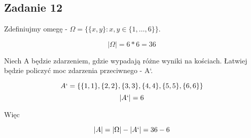 \subsection{Zadanie 12}

Zdefiniujmy omegę - $\Omega = \{\{x,y\} : x, y \in \{1, \dots , 6\}\}$.

$$|\Omega| = 6 * 6 = 36$$

Niech A będzie zdarzeniem, gdzie wypadają różne wyniki na kościach.
Łatwiej będzie policzyć moc zdarzenia przeciwnego - A`.

$$A` = \{\{1,1\}, \{2,2\}, \{3,3\}, \{4,4\}, \{5,5\}, \{6,6\}\}$$
$$|A`| = 6$$

Więc

$$|A| = |\Omega| - |A`| = 36 - 6$$

